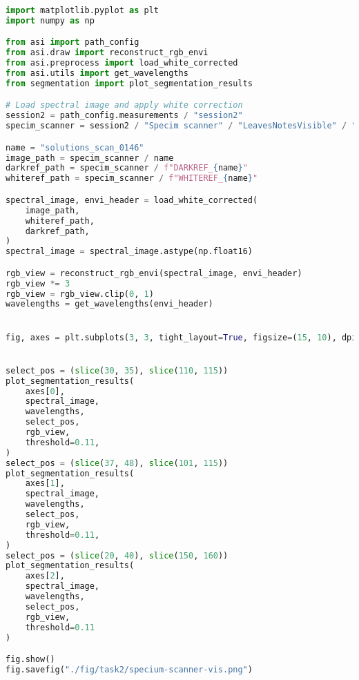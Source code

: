\begin{lstlisting}[language=python, caption=Segmentation of leaves by Specim Scnaner in visible wavelengths, label={code:leaves-specim-vis}]
import matplotlib.pyplot as plt
import numpy as np

from asi import path_config
from asi.draw import reconstruct_rgb_envi
from asi.preprocess import load_white_corrected
from asi.utils import get_wavelengths
from segmentation import plot_segmentation_results

# Load spectral image and apply white correction
session2 = path_config.measurements / "session2"
specim_scanner = session2 / "Specim scanner" / "LeavesNotesVisible" / "capture"

name = "solutions_scan_0146"
image_path = specim_scanner / name
darkref_path = specim_scanner / f"DARKREF_{name}"
whiteref_path = specim_scanner / f"WHITEREF_{name}"

spectral_image, envi_header = load_white_corrected(
    image_path,
    whiteref_path,
    darkref_path,
)
spectral_image = spectral_image.astype(np.float16)

rgb_view = reconstruct_rgb_envi(spectral_image, envi_header)
rgb_view *= 3
rgb_view = rgb_view.clip(0, 1)
wavelengths = get_wavelengths(envi_header)


fig, axes = plt.subplots(3, 3, tight_layout=True, figsize=(15, 10), dpi=80)


select_pos = (slice(30, 35), slice(110, 115))
plot_segmentation_results(
    axes[0],
    spectral_image,
    wavelengths,
    select_pos,
    rgb_view,
    threshold=0.11,
)
select_pos = (slice(37, 48), slice(101, 115))
plot_segmentation_results(
    axes[1],
    spectral_image,
    wavelengths,
    select_pos,
    rgb_view,
    threshold=0.11,
)
select_pos = (slice(20, 40), slice(150, 160))
plot_segmentation_results(
    axes[2],
    spectral_image,
    wavelengths,
    select_pos,
    rgb_view,
    threshold=0.11
)

fig.show()
fig.savefig("./fig/task2/specium-scanner-vis.png")
\end{lstlisting}